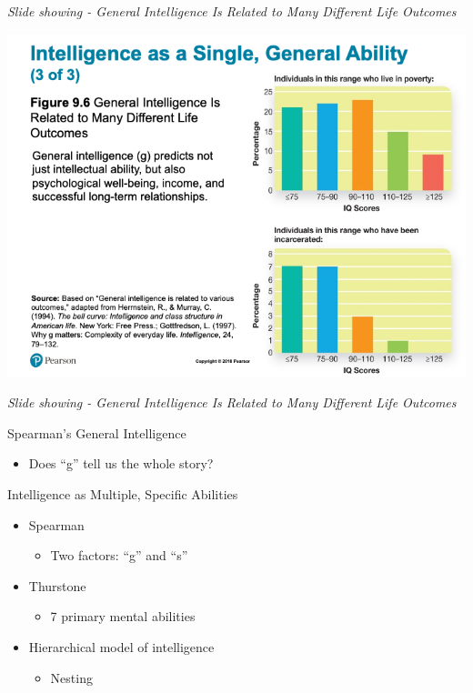 \documentclass[
]{book}
\providecommand{\tightlist}{%
  \setlength{\itemsep}{0pt}\setlength{\parskip}{0pt}}
\begin{document}
\begin{reflect}
\emph{Slide showing - General Intelligence Is Related to Many Different Life Outcomes}

\includegraphics{assets/unit_2/slide_24.png}

\emph{Slide showing - General Intelligence Is Related to Many Different Life Outcomes}

Spearman's General Intelligence

\begin{itemize}
\tightlist
\item
  Does ``g'' tell us the whole story?
\end{itemize}

Intelligence as Multiple, Specific Abilities

\begin{itemize}
\tightlist
\item
  Spearman

  \begin{itemize}
  \tightlist
  \item
    Two factors: ``g'' and ``s''\\
  \end{itemize}
\item
  Thurstone

  \begin{itemize}
  \tightlist
  \item
    7 primary mental abilities\\
  \end{itemize}
\item
  Hierarchical model of intelligence

  \begin{itemize}
  \tightlist
  \item
    Nesting
  \end{itemize}
\end{itemize}


\end{reflect}
\end{document}
